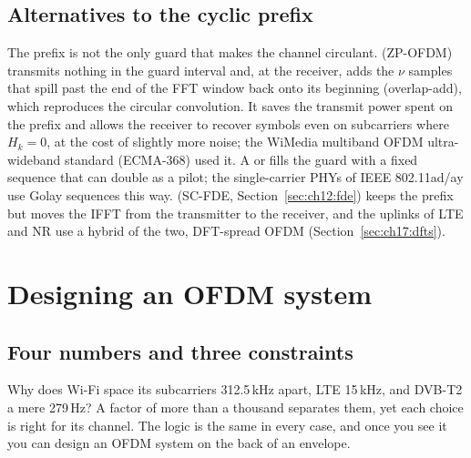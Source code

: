 
\subsection{Alternatives to the cyclic prefix}

The prefix is not the only guard that makes the channel circulant.  (ZP-OFDM)
transmits nothing in the guard interval and, at the receiver, adds the $\nu$ samples that spill past
the end of the FFT window back onto its beginning (overlap-add), which reproduces the circular
convolution. It saves the transmit power spent on the prefix and allows the receiver to recover
symbols even on subcarriers where $H_k=0$, at the cost of slightly more noise; the WiMedia multiband
OFDM ultra-wideband standard (ECMA-368) used it. A  or 
fills the guard with a fixed sequence that can double as a pilot; the single-carrier PHYs of IEEE
802.11ad/ay use Golay sequences this way. 
(SC-FDE, Section~\ref{sec:ch12:fde}) keeps the prefix but moves the IFFT from the transmitter to the
receiver, and the uplinks of LTE and NR use a hybrid of the two, DFT-spread OFDM
(Section~\ref{sec:ch17:dfts}).

\section{Designing an OFDM system}
\label{sec:ch17:design}

\subsection{Four numbers and three constraints}

Why does Wi-Fi space its subcarriers 312.5\,kHz apart, LTE 15\,kHz, and DVB-T2 a mere 279\,Hz? A
factor of more than a thousand separates them, yet each choice is right for its channel. The
logic is the same in every case, and once you see it you can design an OFDM system on the back of
an envelope.

